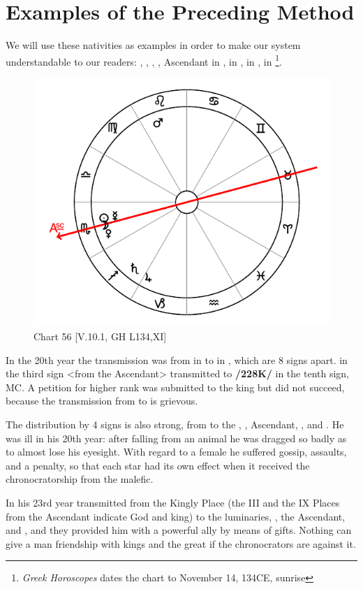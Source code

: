 \section{Examples of the Preceding Method}

We will use these nativities as examples in order to make our system understandable to our readers: \Sun, \Moon, \Venus, \Mercury, Ascendant in \Scorpio, \Saturn\xspace in \Sagittarius, \Jupiter\xspace in \Capricorn, \Mars\xspace in \Leo\footnote{\textit{Greek Horoscopes} dates the chart to November 14, 134CE, sunrise}. 

\begin{figure}
\centering
\vspace{-20pt}
\includegraphics[width=.68\textwidth]{charts/5_10_01}
\caption{Chart 56 [V.10.1, GH L134,XI]}
\label{fig:chart56}
\end{figure}

In the 20th year the transmission was from \Jupiter\xspace in \Capricorn\xspace to \Mars\xspace in \Leo, which are 8 signs
apart. \Jupiter\xspace in the third sign <from the Ascendant> transmitted to \Mars\xspace \textbf{/228K/} in the tenth sign, MC.
A petition for higher rank was submitted to the king but did not succeed, because the transmission from \Jupiter\xspace to \Mars\xspace is grievous. 

The distribution by 4 signs is also strong, from \Mars\xspace to the \Sun, \Moon, Ascendant, \Mercury, and \Venus. He was ill in his 20th year: after falling from an animal he was dragged so badly as to almost lose his eyesight. With regard to a female he suffered gossip, assaults, and a penalty, so that each star had its own effect when it received the chronocratorship from the malefic. 

In his 23rd year \Jupiter transmitted from the Kingly Place (the III and the IX Places from the Ascendant indicate God and king) to the luminaries, \Venus, the Ascendant, and \Mercury, and they provided him with a powerful ally by means of gifts. Nothing can give a man friendship with kings and the great if the chronocrators are against it.

